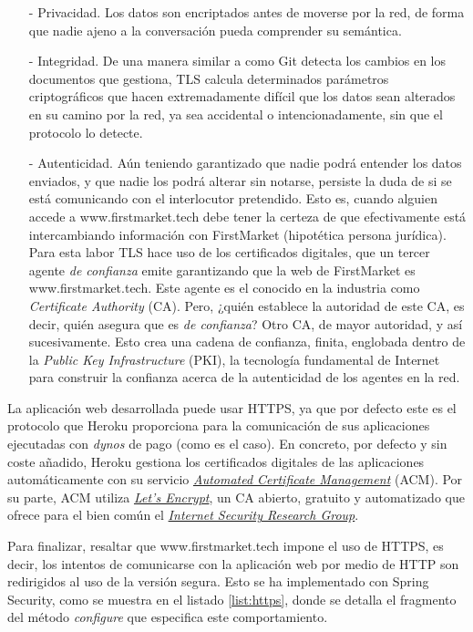 \documentclass[a4paper]{article}
\begin{document}
		\begin{itemize}
			\item[-] Privacidad. Los datos son encriptados antes de moverse por la red, de forma que nadie ajeno a la conversación pueda comprender su semántica.
			\item[-] Integridad. De una manera similar a como Git detecta los cambios en los documentos que gestiona, TLS calcula determinados parámetros criptográficos que hacen extremadamente difícil que los datos sean alterados en su camino por la red, ya sea accidental o intencionadamente, sin que el protocolo lo detecte.
			\item[-] Autenticidad. Aún teniendo garantizado que nadie podrá entender los datos enviados, y que nadie los podrá alterar sin notarse, persiste la duda de si se está comunicando con el interlocutor pretendido. Esto es, cuando alguien accede a www.firstmarket.tech debe tener la certeza de que efectivamente está intercambiando información con FirstMarket (hipotética persona jurídica). Para esta labor TLS hace uso de los certificados digitales, que un tercer agente \emph{de confianza} emite garantizando que la web de FirstMarket es www.firstmarket.tech. Este agente es el conocido en la industria como \emph{Certificate Authority} (CA). Pero, ¿quién establece la autoridad de este CA, es decir, quién asegura que es \emph{de confianza}? Otro CA, de mayor autoridad, y así sucesivamente. Esto crea una cadena de confianza, finita, englobada dentro de la \emph{Public Key Infrastructure} (PKI), la tecnología fundamental de Internet para construir la confianza acerca de la autenticidad de los agentes en la red.
		\end{itemize}
	
	La aplicación web desarrollada puede usar HTTPS, ya que por defecto este es el protocolo que Heroku proporciona para la comunicación de sus aplicaciones ejecutadas con \emph{dynos} de pago (como es el caso). En concreto, por defecto y sin coste añadido, Heroku gestiona los certificados digitales de las aplicaciones automáticamente con su servicio \href{https://devcenter.heroku.com/articles/automated-certificate-management}{\emph{Automated Certificate Management}} (ACM). Por su parte, ACM utiliza \href{https://letsencrypt.org/}{\emph{Let’s Encrypt}}, un CA abierto, gratuito y automatizado que ofrece para el bien común el \href{https://www.abetterinternet.org/}{\emph{Internet Security Research Group}}.
	
	Para finalizar, resaltar que www.firstmarket.tech impone el uso de HTTPS, es decir, los intentos de comunicarse con la aplicación web por medio de HTTP son redirigidos al uso de la versión segura. Esto se ha implementado con Spring Security, como se muestra en el listado \ref{list:https}, donde se detalla el fragmento del método \emph{configure} que especifica este comportamiento.
	\\
	
\end{document}
